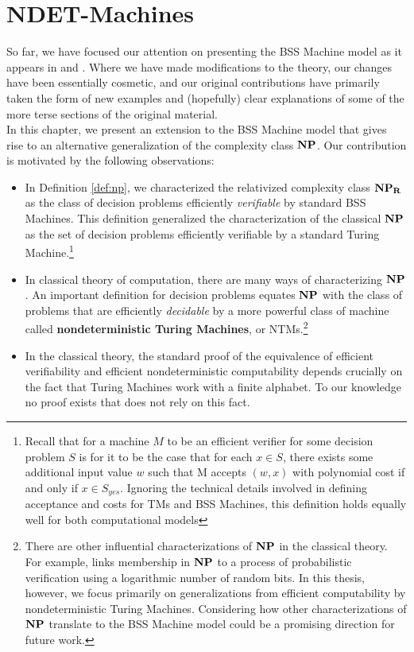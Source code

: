 \chapter{NDET-Machines}
\label{chap:ndet}

So far, we have focused our attention on presenting the BSS Machine
model as it appears in \cite{B98} and \cite{B89}.  Where we have made
modifications to the theory, our changes have been essentially
cosmetic, and our original contributions have primarily taken the form
of new examples and (hopefully) clear explanations of some of the more
terse sections of the original material.\\

In this chapter, we present an extension to the BSS Machine model that
gives rise to an alternative generalization of the complexity class
$\mathbf{NP}$.  Our contribution is motivated by the following observations:

\begin{itemize}

\item In Definition \ref{def:np}, we characterized the relativized
  complexity class $\mathbf{NP_R}$ as the class of decision problems efficiently
  \emph{verifiable} by standard BSS Machines.  This definition
  generalized the characterization of the classical $\mathbf{NP}$ as the set
  of decision problems efficiently verifiable by a standard Turing
  Machine.\footnote{Recall that for a machine $M$ to be an efficient
    verifier for some decision problem $S$ is for it to be the case
    that for each $x \in S$, there exists some additional input value
    $w$ such that M accepts $(w, x)$ with polynomial cost if and only
    if $x \in S_{yes}$.  Ignoring the technical details involved in
    defining acceptance and costs for TMs and BSS Machines, this
    definition holds equally well for both computational models}
  
\item In classical theory of computation, there are many ways of
  characterizing $\mathbf{NP}$.  An important definition for decision
  problems equates $\mathbf{NP}$ with the class of problems that are
  efficiently \emph{decidable} by a more powerful class of machine
  called \textbf{nondeterministic Turing Machines}, or
  NTMs.\footnote{There are other influential characterizations of
    $\mathbf{NP}$ in the classical theory.  For example, \cite{AS98} links
    membership in $\mathbf{NP}$ to a process of probabilistic verification
    using a logarithmic number of random bits.  In this thesis,
    however, we focus primarily on generalizations from efficient
    computability by nondeterministic Turing Machines.  Considering
    how other characterizations of $\mathbf{NP}$ translate to the BSS
    Machine model could be a promising direction for future work.}

\item In the classical theory, the standard proof of the equivalence
  of efficient verifiability and efficient nondeterministic
  computability depends crucially on the fact that Turing Machines
  work with a finite alphabet.  To our knowledge no proof exists that
  does not rely on this fact.
\end{itemize}

